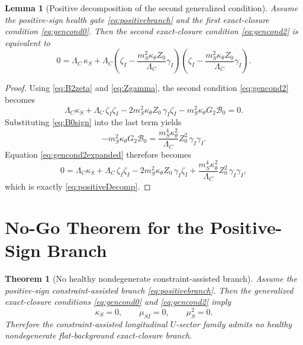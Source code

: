 \documentclass[11pt]{article}
\newtheorem{lemma}{Lemma}
\newtheorem{theorem}{Theorem}
\begin{document}
\begin{lemma}[Positive decomposition of the second generalized condition]
Assume the positive-sign health gate \eqref{eq:positivebranch} and the first exact-closure condition \eqref{eq:gencond0}. Then the second exact-closure condition \eqref{eq:gencond2} is equivalent to
\begin{equation}
0
=
\Lambda_C\,\kappa_S
+\Lambda_C
\left(
\zeta_I-\frac{m_S^2\kappa_\theta Z_0}{\Lambda_C}\gamma_I
\right)
\left(
\zeta_I-\frac{m_S^2\kappa_\theta Z_0}{\Lambda_C}\gamma_I
\right).
\label{eq:positiveDecomp}
\end{equation}
\end{lemma}

\begin{proof}
Using \eqref{eq:B2zeta} and \eqref{eq:Zgamma}, the second condition \eqref{eq:gencond2} becomes
\begin{equation}
\Lambda_C\kappa_S
+\Lambda_C\,\zeta_I\zeta_I
-2m_S^2\kappa_\theta Z_0\,\gamma_I\zeta_I
-m_S^2\kappa_\theta G_2\mathcal B_0
=
0.
\label{eq:gencond2expanded}
\end{equation}
Substituting \eqref{eq:B0sign} into the last term yields
\[
-m_S^2\kappa_\theta G_2\mathcal B_0
=
\frac{m_S^4\kappa_\theta^2}{\Lambda_C}Z_0^2\,\gamma_I\gamma_I.
\]
Equation \eqref{eq:gencond2expanded} therefore becomes
\[
0
=
\Lambda_C\kappa_S
+\Lambda_C\,\zeta_I\zeta_I
-2m_S^2\kappa_\theta Z_0\,\gamma_I\zeta_I
+\frac{m_S^4\kappa_\theta^2}{\Lambda_C}Z_0^2\,\gamma_I\gamma_I,
\]
which is exactly \eqref{eq:positiveDecomp}.
\end{proof}

\section{No-Go Theorem for the Positive-Sign Branch}

\begin{theorem}[No healthy nondegenerate constraint-assisted branch]
\label{thm:constraint-nogo}
Assume the positive-sign constraint-assisted branch \eqref{eq:positivebranch}. Then the generalized exact-closure conditions \eqref{eq:gencond0} and \eqref{eq:gencond2} imply
\begin{equation}
\kappa_S=0,
\qquad
\mu_{SI}=0,
\qquad
\mu_S^2=0.
\label{eq:collapsedconditions}
\end{equation}
Therefore the constraint-assisted longitudinal \(U\)-sector family admits no healthy nondegenerate flat-background exact-closure branch.
\end{theorem}
\end{document}
